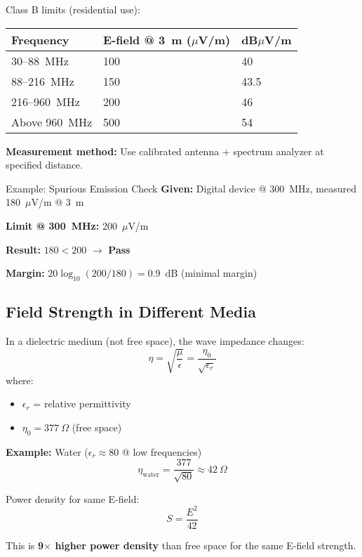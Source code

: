 Class B limits (residential use):

\begin{center}
\begin{tabular}{@{}lll@{}}
\toprule
Frequency & E-field @ 3~m ($\mu$V/m) & dB$\mu$V/m \\
\midrule
30--88~MHz & 100 & 40 \\
88--216~MHz & 150 & 43.5 \\
216--960~MHz & 200 & 46 \\
Above 960~MHz & 500 & 54 \\
\bottomrule
\end{tabular}
\end{center}

\textbf{Measurement method:} Use calibrated antenna + spectrum analyzer at specified distance.

\begin{calloutbox}{Example: Spurious Emission Check}
\textbf{Given:} Digital device @ 300~MHz, measured 180~$\mu$V/m @ 3~m

\textbf{Limit @ 300~MHz:} 200~$\mu$V/m

\textbf{Result:} $180 < 200$ $\rightarrow$ \textbf{Pass}

\textbf{Margin:} $20\log_{10}(200/180) = 0.9$~dB (minimal margin)
\end{calloutbox}

\subsection{Field Strength in Different Media}

In a dielectric medium (not free space), the wave impedance changes:
\begin{equation}
\eta = \sqrt{\frac{\mu}{\epsilon}} = \frac{\eta_0}{\sqrt{\epsilon_r}}
\label{eq:impedance-dielectric}
\end{equation}
where:
\begin{itemize}
\item $\epsilon_r$ = relative permittivity
\item $\eta_0 = 377~\Omega$ (free space)
\end{itemize}

\textbf{Example:} Water ($\epsilon_r \approx 80$ @ low frequencies)
\[
\eta_{\text{water}} = \frac{377}{\sqrt{80}} \approx 42~\Omega
\]

Power density for same E-field:
\[
S = \frac{E^2}{42}
\]

This is \textbf{9$\times$ higher power density} than free space for the same E-field strength.

